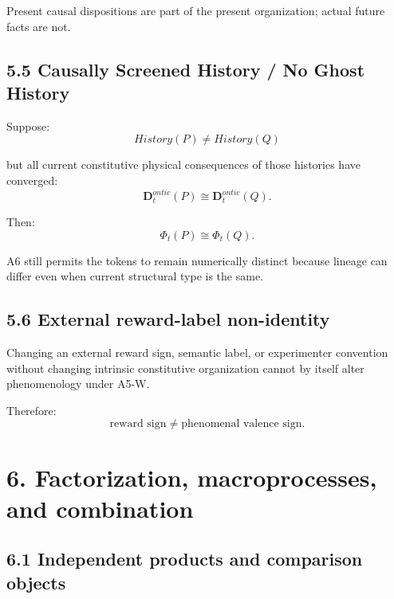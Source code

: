 \documentclass[
  11pt,
  a4paper,
]{article}
\begin{document}
Present causal dispositions are part of the present organization; actual
future facts are not.

\hypertarget{causally-screened-history-no-ghost-history}{%
\subsection{5.5 Causally Screened History / No Ghost
History}\label{causally-screened-history-no-ghost-history}}

Suppose:
\nopagebreak[4]
\[
History(P)\neq History(Q)
\]

but all current constitutive physical consequences of those histories
have converged:
\nopagebreak[4]
\[
\mathbf D^{ontic}_t(P)
\cong
\mathbf D^{ontic}_t(Q).
\]

Then:
\nopagebreak[4]
\[
\boxed{
\Phi_t(P)\cong\Phi_t(Q).
}
\]

A6 still permits the tokens to remain numerically distinct because
lineage can differ even when current structural type is the same.

\hypertarget{external-reward-label-non-identity}{%
\subsection{5.6 External reward-label
non-identity}\label{external-reward-label-non-identity}}

Changing an external reward sign, semantic label, or experimenter
convention without changing intrinsic constitutive organization cannot
by itself alter phenomenology under A5-W.

Therefore:
\nopagebreak[4]
\[
\boxed{
\text{reward sign}
\neq
\text{phenomenal valence sign}.
}
\]

\hypertarget{factorization-macroprocesses-and-combination}{%
\section{6. Factorization, macroprocesses, and
combination}\label{factorization-macroprocesses-and-combination}}

\hypertarget{independent-products-and-comparison-objects}{%
\subsection{6.1 Independent products and comparison
objects}\label{independent-products-and-comparison-objects}}
\end{document}
